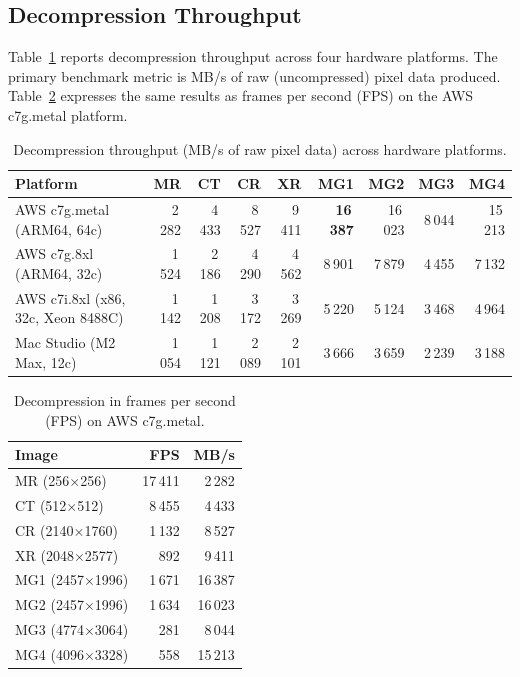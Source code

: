 \documentclass[11pt,twocolumn]{article}
\begin{document}
\subsection{Decompression Throughput}

Table~\ref{tab:decompression} reports decompression throughput across four hardware platforms.
The primary benchmark metric is MB/s of raw (uncompressed) pixel data produced.
Table~\ref{tab:fps} expresses the same results as frames per second (FPS) on the AWS c7g.metal platform.

\begin{table}[t]
\centering
\caption{Decompression throughput (MB/s of raw pixel data) across hardware platforms.}
\label{tab:decompression}
\small
\begin{tabular}{@{}lrrrrrrrr@{}}
\toprule
Platform & MR & CT & CR & XR & MG1 & MG2 & MG3 & MG4 \\
\midrule
AWS c7g.metal (ARM64, 64c)          & 2\,282 & 4\,433 & 8\,527 & 9\,411 & \textbf{16\,387} & 16\,023 & 8\,044 & 15\,213 \\
AWS c7g.8xl (ARM64, 32c)            & 1\,524 & 2\,186 & 4\,290 & 4\,562 & 8\,901 & 7\,879 & 4\,455 & 7\,132 \\
AWS c7i.8xl (x86, 32c, Xeon 8488C) & 1\,142 & 1\,208 & 3\,172 & 3\,269 & 5\,220 & 5\,124 & 3\,468 & 4\,964 \\
Mac Studio (M2 Max, 12c)            & 1\,054 & 1\,121 & 2\,089 & 2\,101 & 3\,666 & 3\,659 & 2\,239 & 3\,188 \\
\bottomrule
\end{tabular}
\end{table}

\begin{table}[t]
\centering
\caption{Decompression in frames per second (FPS) on AWS c7g.metal.}
\label{tab:fps}
\small
\begin{tabular}{@{}lrr@{}}
\toprule
Image & FPS & MB/s \\
\midrule
MR (256$\times$256)   & 17\,411 & 2\,282 \\
CT (512$\times$512)   & 8\,455  & 4\,433 \\
CR (2140$\times$1760) & 1\,132  & 8\,527 \\
XR (2048$\times$2577) & 892     & 9\,411 \\
MG1 (2457$\times$1996) & 1\,671 & 16\,387 \\
MG2 (2457$\times$1996) & 1\,634 & 16\,023 \\
MG3 (4774$\times$3064) & 281    & 8\,044 \\
MG4 (4096$\times$3328) & 558    & 15\,213 \\
\bottomrule
\end{tabular}
\end{table}
\end{document}
